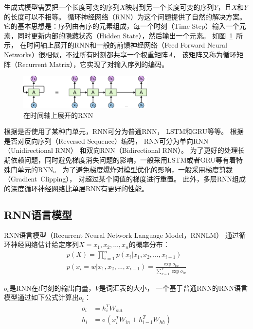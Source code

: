 生成式模型需要把一个长度可变的序列$X$映射到另一个长度可变的序列$Y$，且$X$和$Y$的长度可以不相等。
循环神经网络（RNN）为这个问题提供了自然的解决方案。
它的基本思想是：序列由有序的元素组成，每一个时刻（Time Step）输入一个元素，同时更新内部的隐藏状态（Hidden State），然后输出一个元素。
如图~\ref{fig:RNN_unrolled}~所示，
在时间轴上展开的RNN和一般的前馈神经网络（Feed Forward Neural Networks）很相似，不过所有时刻都共享一个权重矩阵$A$，
该矩阵又称为循环矩阵（Recurrent Matrix），它实现了对输入序列的编码。
\begin{figure}[H]
    \centering
    \includegraphics[width=0.6\textwidth]{figure/RNN-unrolled.png}
    \caption{在时间轴上展开的RNN}
    \label{fig:RNN_unrolled}
\end{figure}

根据是否使用了某种门单元，RNN可分为普通RNN，
LSTM和GRU等等。
根据是否对反向序列（Reversed Sequence）编码，
RNN可分为单向RNN（Unidirectional RNN）
和双向RNN（Bidirectional RNN）。
为了更好的处理长期依赖问题，同时避免梯度消失问题的影响，一般采用LSTM或者GRU等有着特殊门单元的RNN。
为了避免梯度爆炸对模型优化的影响，一般采用梯度剪裁（Gradient~Clipping），
对超过某个阈值的梯度进行重置。
此外，多层RNN组成的深度循环神经网络比单层RNN有更好的性能。

\subsection{RNN语言模型}\label{subsec:RNNLM}
RNN语言模型（Recurrent Neural Network Language Model，RNNLM）
通过循环神经网络估计给定序列$X = x_1, x_2, \dots, x_n$的概率分布：
\begin{align}
    p(X) = \prod_{i=1}^{n} p(x_i|x_1, x_2, \dots, x_{i-1})
    \label{eqn:language_model_probability} \\
    p(x_i = w|x_1, x_2, \dots, x_{i-1}) = \frac{\exp{o_{tw}}}{\sum_{v=1}^V \exp{o_{tv}}}
    \label{eqn:language_model_estimation}
\end{align}

$o_t$是RNN在$t$时刻的输出向量，$V$是词汇表的大小，
一个基于普通RNN的RNN语言模型通过如下公式计算出$o_t$：
\begin{align}
    o_i &= h_i^T W_{out} \\
    h_i &= \sigma \left( x_i^T W_{in} + h_{i-1}^T W_{hh} \right)
\end{align}

